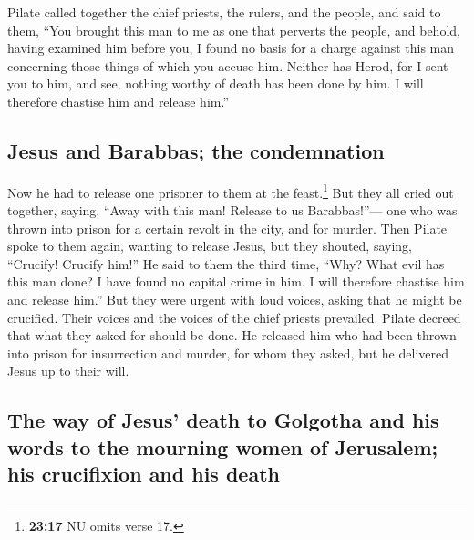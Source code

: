  Pilate called together the chief priests, the rulers,
and the people,  and said to them, ``You brought this man
to me as one that perverts the people, and behold, having examined him
before you, I found no basis for a charge against this man concerning
those things of which you accuse him.  Neither has Herod,
for I sent you to him, and see, nothing worthy of death has been done by
him.  I will therefore chastise him and release him.''

\hypertarget{jesus-and-barabbas-the-condemnation}{%
\subsection{Jesus and Barabbas; the
condemnation}\label{jesus-and-barabbas-the-condemnation}}

 Now he had to release one prisoner to them at the
feast.\footnote{\textbf{23:17} NU omits verse 17.}  But
they all cried out together, saying, ``Away with this man! Release to us
Barabbas!''---  one who was thrown into prison for a
certain revolt in the city, and for murder.  Then Pilate
spoke to them again, wanting to release Jesus,  but they
shouted, saying, ``Crucify! Crucify him!''  He said to
them the third time, ``Why? What evil has this man done? I have found no
capital crime in him. I will therefore chastise him and release him.''
 But they were urgent with loud voices, asking that he
might be crucified. Their voices and the voices of the chief priests
prevailed.  Pilate decreed that what they asked for
should be done.  He released him who had been thrown into
prison for insurrection and murder, for whom they asked, but he
delivered Jesus up to their will.

\hypertarget{the-way-of-jesus-death-to-golgotha-and-his-words-to-the-mourning-women-of-jerusalem-his-crucifixion-and-his-death}{%
\subsection{The way of Jesus' death to Golgotha and his words to the
mourning women of Jerusalem; his crucifixion and his
death}\label{the-way-of-jesus-death-to-golgotha-and-his-words-to-the-mourning-women-of-jerusalem-his-crucifixion-and-his-death}}

